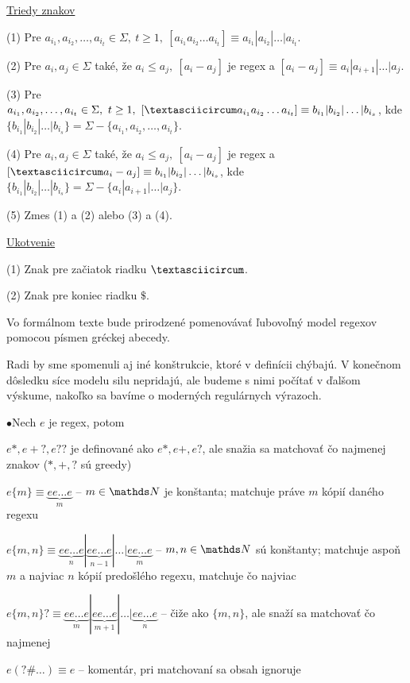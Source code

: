 \underline{Triedy znakov}
\begin{list}{}{}
\item[(1)] Pre $a_{i_1},a_{i_2},\dots ,a_{i_t} \in \Sigma,~t \geq 1,~\left[ a_{i_1}a_{i_2}\dots a_{i_t} \right] \equiv a_{i_1}|a_{i_2}|\dots |a_{i_t} $.
\item[(2)] Pre $a_i,a_j \in \Sigma$ také, že $a_i\leq a_j,~ [a_i-a_j]$ je regex a $[a_i-a_j]\equiv a_i|a_{i+1}|\dots |a_j$.
\item[(3)] Pre $a_{i_1},a_{i_2},\dots ,a_{i_t} \in \Sigma,~t \geq 1,~\left[ \textasciicircum a_{i_1}a_{i_2}\dots a_{i_t} \right] \equiv b_{i_1}|b_{i_2}|\dots |b_{i_s} $, kde $\lbrace b_{i_1}|b_{i_2}|\dots |b_{i_s}\rbrace = \Sigma - \lbrace a_{i_1},a_{i_2},\dots ,a_{i_t} \rbrace$.
\item[(4)] Pre $a_i,a_j \in \Sigma$ také, že $a_i\leq a_j,~ [a_i-a_j]$ je regex a $[\textasciicircum a_i-a_j]\equiv b_{i_1}|b_{i_2}|\dots |b_{i_s}$, kde $\lbrace b_{i_1}|b_{i_2}|\dots |b_{i_s}\rbrace = \Sigma - \lbrace a_i|a_{i+1}|\dots |a_j \rbrace$.
\item[(5)] Zmes (1) a (2) alebo (3) a (4).
\end{list}

\underline{Ukotvenie}
\begin{list}{}{}
\item[(1)] Znak pre začiatok riadku $ \textasciicircum $.
\item[(2)] Znak pre koniec riadku $ \mathdollar $.
\end{list}

Vo formálnom texte bude prirodzené pomenovávať ľubovoľný model regexov pomocou písmen gréckej abecedy.

Radi by sme spomenuli aj iné konštrukcie, ktoré v definícii chýbajú. V konečnom dôsledku síce modelu silu nepridajú, ale budeme s nimi počítať v ďalšom výskume, nakoľko sa bavíme o moderných regulárnych výrazoch.

\begin{list}{$\bullet$}{Nech $e$ je regex, potom}
\item $e*,e+?,e??$ je definované ako $e*,e+,e?$, ale snažia sa matchovať čo najmenej znakov ($*,+,?$ sú greedy)
\item $e\lbrace m \rbrace \equiv \underbrace{ee\ldots e}_m$ -- $m \in \N$ je konštanta; matchuje práve $m$ kópií daného regexu
\item $e \lbrace m,n \rbrace \equiv \underbrace{ee\ldots e}_n | \underbrace{ee\ldots e}_{n-1} | \dots | \underbrace{ee\ldots e}_m$ --  $m, n \in \N$ sú konštanty; matchuje aspoň $m$ a najviac $n$ kópií predošlého regexu, matchuje čo najviac
\item $e \lbrace m,n \rbrace ? \equiv \underbrace{ee\ldots e}_m | \underbrace{ee\ldots e}_{m+1} | \dots | \underbrace{ee\ldots e}_n$ -- čiže ako $ \lbrace m,n \rbrace$, ale snaží sa matchovať čo najmenej
\item $e(?\#\dots ) \equiv e$ -- komentár, pri matchovaní sa obsah ignoruje
\end{list}

